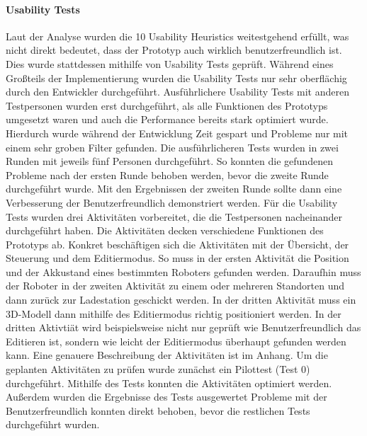 \paragraph{Usability Tests}
Laut der Analyse wurden die 10 Usability Heuristics weitestgehend erfüllt, was nicht direkt bedeutet, dass der Prototyp auch wirklich benutzerfreundlich ist. Dies wurde stattdessen mithilfe von Usability Tests geprüft. Während eines Großteils der Implementierung wurden die Usability Tests nur sehr oberflächig durch den Entwickler durchgeführt. Ausführlichere Usability Tests mit anderen Testpersonen wurden erst durchgeführt, als alle Funktionen des Prototyps umgesetzt waren und auch die Performance bereits stark optimiert wurde. Hierdurch wurde während der Entwicklung Zeit gespart und Probleme nur mit einem sehr groben Filter gefunden. Die ausführlicheren Tests wurden in zwei Runden mit jeweils fünf Personen durchgeführt. So konnten die gefundenen Probleme nach der ersten Runde behoben werden, bevor die zweite Runde durchgeführt wurde. Mit den Ergebnissen der zweiten Runde sollte dann eine Verbesserung der Benutzerfreundlich demonstriert werden. Für die Usability Tests wurden drei Aktivitäten vorbereitet, die die Testpersonen nacheinander durchgeführt haben. Die Aktivitäten decken verschiedene Funktionen des Prototyps ab. Konkret beschäftigen sich die Aktivitäten mit der Übersicht, der Steuerung und dem Editiermodus. So muss in der ersten Aktivität die Position und der Akkustand eines bestimmten Roboters gefunden werden. Daraufhin muss der Roboter in der zweiten Aktivität zu einem oder mehreren Standorten und dann zurück zur Ladestation geschickt werden. In der dritten Aktivität muss ein 3D-Modell dann mithilfe des Editiermodus richtig positioniert werden. In der dritten Aktivtiät wird beispielsweise nicht nur geprüft wie Benutzerfreundlich das Editieren ist, sondern wie leicht der Editiermodus überhaupt gefunden werden kann. Eine genauere Beschreibung der Aktivitäten ist im Anhang.
Um die geplanten Aktivitäten zu prüfen wurde zunächst ein Pilottest (Test 0) durchgeführt. Mithilfe des Tests konnten die Aktivitäten optimiert werden. Außerdem wurden die Ergebnisse des Tests ausgewertet Probleme mit der Benutzerfreundlich konnten direkt behoben, bevor die restlichen Tests durchgeführt wurden.

